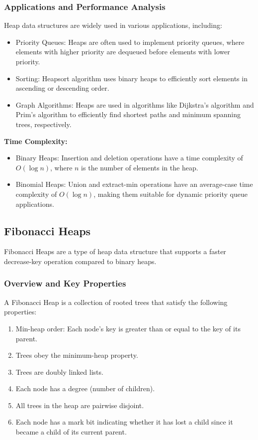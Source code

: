 \documentclass[12pt]{book} %
\begin{document}
\subsubsection{Applications and Performance Analysis}
Heap data structures are widely used in various applications, including:
\begin{itemize}
    \item Priority Queues: Heaps are often used to implement priority queues, where elements with higher priority are dequeued before elements with lower priority.
    \item Sorting: Heapsort algorithm uses binary heaps to efficiently sort elements in ascending or descending order.
    \item Graph Algorithms: Heaps are used in algorithms like Dijkstra's algorithm and Prim's algorithm to efficiently find shortest paths and minimum spanning trees, respectively.
\end{itemize}

\textbf{Time Complexity:}
\begin{itemize}
    \item Binary Heaps: Insertion and deletion operations have a time complexity of \(O(\log n)\), where \(n\) is the number of elements in the heap.
    \item Binomial Heaps: Union and extract-min operations have an average-case time complexity of \(O(\log n)\), making them suitable for dynamic priority queue applications.
\end{itemize}

\subsection{Fibonacci Heaps}
Fibonacci Heaps are a type of heap data structure that supports a faster decrease-key operation compared to binary heaps.

\subsubsection{Overview and Key Properties}
A Fibonacci Heap is a collection of rooted trees that satisfy the following properties:
\begin{enumerate}
    \item Min-heap order: Each node's key is greater than or equal to the key of its parent.
    \item Trees obey the minimum-heap property.
    \item Trees are doubly linked lists.
    \item Each node has a degree (number of children).
    \item All trees in the heap are pairwise disjoint.
    \item Each node has a mark bit indicating whether it has lost a child since it became a child of its current parent.
\end{enumerate}
\end{document}
